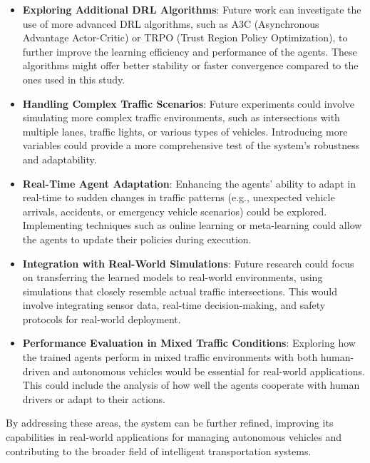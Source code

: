 \begin{itemize}
    \item \textbf{Exploring Additional DRL Algorithms}: Future work can investigate the use of more advanced DRL algorithms, such as A3C (Asynchronous Advantage Actor-Critic) or TRPO (Trust Region Policy Optimization), to further improve the learning efficiency and performance of the agents. These algorithms might offer better stability or faster convergence compared to the ones used in this study.
    \item \textbf{Handling Complex Traffic Scenarios}: Future experiments could involve simulating more complex traffic environments, such as intersections with multiple lanes, traffic lights, or various types of vehicles. Introducing more variables could provide a more comprehensive test of the system's robustness and adaptability.
    \item \textbf{Real-Time Agent Adaptation}: Enhancing the agents' ability to adapt in real-time to sudden changes in traffic patterns (e.g., unexpected vehicle arrivals, accidents, or emergency vehicle scenarios) could be explored. Implementing techniques such as online learning or meta-learning could allow the agents to update their policies during execution.
    \item \textbf{Integration with Real-World Simulations}: Future research could focus on transferring the learned models to real-world environments, using simulations that closely resemble actual traffic intersections. This would involve integrating sensor data, real-time decision-making, and safety protocols for real-world deployment.
    \item \textbf{Performance Evaluation in Mixed Traffic Conditions}: Exploring how the trained agents perform in mixed traffic environments with both human-driven and autonomous vehicles would be essential for real-world applications. This could include the analysis of how well the agents cooperate with human drivers or adapt to their actions.
\end{itemize}

By addressing these areas, the system can be further refined, improving its capabilities in real-world applications for managing autonomous vehicles and contributing to the broader field of intelligent transportation systems.